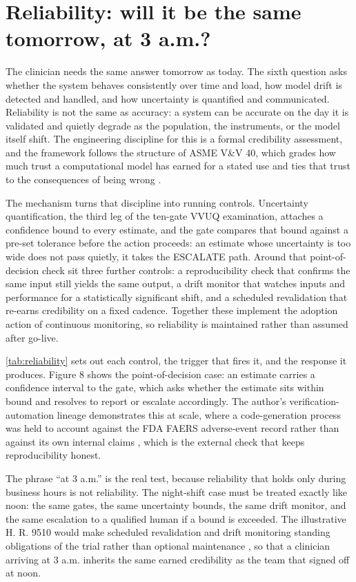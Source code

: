 \section{Reliability: will it be the same tomorrow, at 3 a.m.?}
\label{sec:reliability}

The clinician needs the same answer tomorrow as today. The sixth question asks
whether the system behaves consistently over time and load, how model drift is
detected and handled, and how uncertainty is quantified and communicated.
Reliability is not the same as accuracy: a system can be accurate on the day it is
validated and quietly degrade as the population, the instruments, or the model
itself shift. The engineering discipline for this is a formal credibility
assessment, and the framework follows the structure of ASME V\&V 40, which grades
how much trust a computational model has earned for a stated use and ties that
trust to the consequences of being wrong \cite{asme2018vv40}.

The mechanism turns that discipline into running controls. Uncertainty
quantification, the third leg of the ten-gate VVUQ examination, attaches a
confidence bound to every estimate, and the gate compares that bound against a
pre-set tolerance before the action proceeds: an estimate whose uncertainty is too
wide does not pass quietly, it takes the ESCALATE path. Around that point-of-
decision check sit three further controls: a reproducibility check that confirms
the same input still yields the same output, a drift monitor that watches inputs
and performance for a statistically significant shift, and a scheduled
revalidation that re-earns credibility on a fixed cadence. Together these implement
the adoption action of continuous monitoring, so reliability is maintained rather
than assumed after go-live.

\autoref{tab:reliability} sets out each control, the trigger that fires it, and the
response it produces. Figure 8 shows the point-of-decision case: an estimate
carries a confidence interval to the gate, which asks whether the estimate sits
within bound and resolves to report or escalate accordingly. The author's
verification-automation lineage demonstrates this at scale, where a code-generation
process was held to account against the FDA FAERS adverse-event record rather than
against its own internal claims \cite{Kawchak2025CodeGenerationCompetition16},
which is the external check that keeps reproducibility honest.

The phrase ``at 3 a.m.'' is the real test, because reliability that holds only
during business hours is not reliability. The night-shift case must be treated
exactly like noon: the same gates, the same uncertainty bounds, the same drift
monitor, and the same escalation to a qualified human if a bound is exceeded. The
illustrative H. R. 9510 would make scheduled revalidation and drift monitoring
standing obligations of the trial rather than optional maintenance
\cite{Kawchak2026HR9510Bill}, so that a clinician arriving at 3 a.m. inherits the
same earned credibility as the team that signed off at noon.

